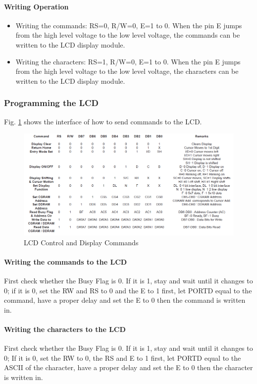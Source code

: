 \documentclass[]{report}
\begin{document}
\paragraph{Writing Operation}
\begin{itemize}
	\item Writing the commands: RS=0, R/W=0, E=1 to 0. When the pin E jumps from the high level voltage to the low level voltage, the commands can be written to the LCD display module.
	\item Writing the characters: RS=1, R/W=0, E=1 to 0. When the pin E jumps from the high level voltage to the low level voltage, the characters can be written to the LCD display module.
\end{itemize}

\subsubsection{Programming the LCD}
Fig. \ref{fig:LCDControlandDisplaycommands} shows the interface of how to send commands to the LCD.

\begin{figure}
\centering
\includegraphics[width=0.7\linewidth]{"../Diagrams/LCD Control and Display commands"}
\caption{LCD Control and Display Commands}
\label{fig:LCDControlandDisplaycommands}
\end{figure}

\paragraph{Writing the commands to the LCD}
First check whether the Busy Flag is 0.  If it is 1, stay and wait until it changes to 0; if it is 0, set the RW and RS to 0 and the E to 1 first, let PORTD equal to the command, have a proper delay and set the E to 0 then the command is written in.

\paragraph{Writing the characters to the LCD}
First check whether the Busy Flag is 0. If it is 1, stay and wait until it changes to 0; If it is 0, set the RW to 0, the RS and E to 1 first, let PORTD equal to the ASCII of the character, have a proper delay and set the E to 0 then the character is written in.
\end{document}
